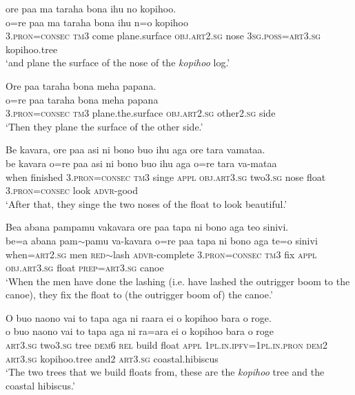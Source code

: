 \ea\label{ex:text17-6}
ore paa ma taraha bona ihu no kopihoo.\\
\gll o=re	paa	ma	taraha	bona	ihu	n=o	kopihoo\\
     3.\textsc{pron}=\textsc{consec}	\textsc{tm}3	come	plane.surface	\textsc{obj}.\textsc{art}2.\textsc{sg}	nose	3\textsc{sg}.\textsc{poss}=\textsc{art}3.\textsc{sg}	kopihoo.tree\\
\glt `and plane the surface of the nose of the \textit{kopihoo} log.'
\z

\ea\label{ex:text17-7}
Ore paa taraha bona meha papana.\\
\gll o=re	paa	taraha	bona	meha	papana\\
     3.\textsc{pron}=\textsc{consec}	\textsc{tm}3	plane.the.surface	\textsc{obj}.\textsc{art}2.\textsc{sg}	other2.\textsc{sg}	side\\
\glt `Then they plane the surface of the other side.'
\z

\ea\label{ex:text17-8}
Be kavara, ore paa asi ni bono buo ihu aga ore tara vamataa.\\
\gll be	kavara	o=re	paa	asi	ni	bono	buo	ihu	aga	o=re	tara	va-mataa\\
     when	finished	3.\textsc{pron}=\textsc{consec}	\textsc{tm}3	singe	\textsc{appl}	\textsc{obj}.\textsc{art}3.\textsc{sg}	two3.\textsc{sg}	nose	float	3.\textsc{pron}=\textsc{consec}	look	\textsc{advr}-good\\
\glt `After that, they singe the two noses of the float to look beautiful.'
\z

\ea\label{ex:text17-9}
Bea abana pampamu vakavara ore paa tapa ni bono aga teo sinivi.\\
\gll be=a	abana	pam{$\sim$}pamu	va-kavara	o=re	paa	tapa	ni	bono	aga	te=o	sinivi\\
     when=\textsc{art}2.\textsc{sg}	men	\textsc{red}{$\sim$}lash	\textsc{advr}-complete	3.\textsc{pron}=\textsc{consec}	\textsc{tm}3	fix	\textsc{appl}	\textsc{obj}.\textsc{art}3.\textsc{sg}	float	\textsc{prep}=\textsc{art}3.\textsc{sg}	canoe\\
\glt `When the men have done the lashing (i.e. have lashed the outrigger boom to the canoe), they fix the float to (the outrigger boom of) the canoe.'
\z

\ea\label{ex:text17-10}
O buo naono vai to tapa aga ni raara ei o kopihoo bara o roge.\\
\gll o	buo	naono	vai	to	tapa	aga	ni	ra=ara	ei	o	kopihoo	bara	o	roge\\
     \textsc{art}3.\textsc{sg}	two3.\textsc{sg}	tree	\textsc{dem}6	\textsc{rel}	build	float	\textsc{appl}	1\textsc{pl}.\textsc{in}.\textsc{ipfv}=1\textsc{pl}.\textsc{in}.\textsc{pron}	\textsc{dem}2	\textsc{art}3.\textsc{sg}	kopihoo.tree	and2	\textsc{art}3.\textsc{sg}	coastal.hibiscus\\
\glt `The two trees that we build floats from, these are the \textit{kopihoo} tree and the coastal hibiscus.'
\z